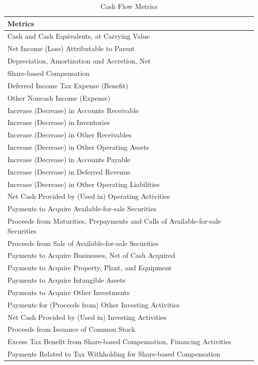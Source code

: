 \documentclass[]{book}
\theoremstyle{definition}
\theoremstyle{definition}
\theoremstyle{definition}
\theoremstyle{remark}
\begin{document}
\begin{table}[t]

\caption{\label{tab:unnamed-chunk-37}Cash Flow Metrics}
\centering
\begin{tabular}{l}
\toprule
Metrics\\
\midrule
Cash and Cash Equivalents, at Carrying Value\\
Net Income (Loss) Attributable to Parent\\
Depreciation, Amortization and Accretion, Net\\
Share-based Compensation\\
Deferred Income Tax Expense (Benefit)\\
\addlinespace
Other Noncash Income (Expense)\\
Increase (Decrease) in Accounts Receivable\\
Increase (Decrease) in Inventories\\
Increase (Decrease) in Other Receivables\\
Increase (Decrease) in Other Operating Assets\\
\addlinespace
Increase (Decrease) in Accounts Payable\\
Increase (Decrease) in Deferred Revenue\\
Increase (Decrease) in Other Operating Liabilities\\
Net Cash Provided by (Used in) Operating Activities\\
Payments to Acquire Available-for-sale Securities\\
\addlinespace
Proceeds from Maturities, Prepayments and Calls of Available-for-sale Securities\\
Proceeds from Sale of Available-for-sale Securities\\
Payments to Acquire Businesses, Net of Cash Acquired\\
Payments to Acquire Property, Plant, and Equipment\\
Payments to Acquire Intangible Assets\\
\addlinespace
Payments to Acquire Other Investments\\
Payments for (Proceeds from) Other Investing Activities\\
Net Cash Provided by (Used in) Investing Activities\\
Proceeds from Issuance of Common Stock\\
Excess Tax Benefit from Share-based Compensation, Financing Activities\\
\addlinespace
Payments Related to Tax Withholding for Share-based Compensation\\

\end{tabular}
\end{table}
\end{document}

